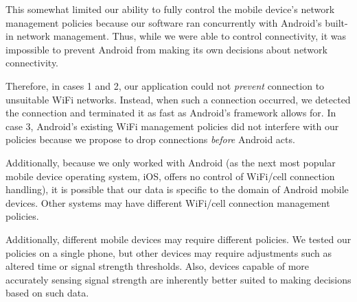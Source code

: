 This somewhat limited our ability to fully control the mobile device's network management policies because our software ran concurrently with Android's built-in network management. Thus, while we were able to control connectivity, it was impossible to prevent Android from making its own decisions about network connectivity.

Therefore, in cases 1 and 2, our application could not \emph{prevent} connection to unsuitable WiFi networks. Instead, when such a connection occurred, we detected the connection and terminated it as fast as Android's framework allows for. In case 3, Android's existing WiFi management policies did not interfere with our policies because we propose to drop connections \emph{before} Android acts.

Additionally, because we only worked with Android (as the next most popular mobile device operating system, iOS, offers no control of WiFi/cell connection handling), it is possible that our data is specific to the domain of Android mobile devices. Other systems may have different WiFi/cell connection management policies.

Additionally, different mobile devices may require different policies. We tested our policies on a single phone, but other devices may require adjustments such as altered time or signal strength thresholds. Also, devices capable of more accurately sensing signal strength are inherently better suited to making decisions based on such data.
